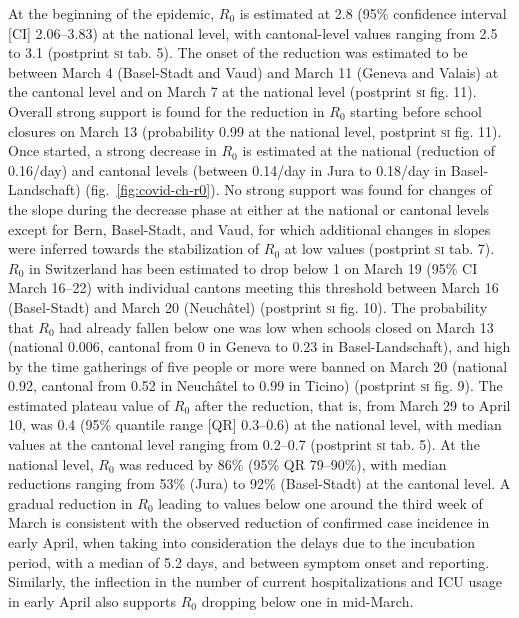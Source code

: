 At the beginning of the epidemic, $R_0$ is estimated at 2.8 (95\% confidence interval [CI] 2.06–3.83) at the national level, with cantonal-level values ranging from 2.5 to 3.1 (postprint \textsc{si} tab. 5). The onset of the reduction was estimated to be between March 4 (Basel-Stadt and Vaud) and March 11 (Geneva and Valais) at the cantonal level and on March 7 at the national level (postprint \textsc{si} fig. 11). Overall strong support is found for the reduction in $R_0$ starting before school closures on March 13 (probability 0.99 at the national level, postprint \textsc{si} fig. 11). Once started, a strong decrease in $R_0$ is estimated at the national (reduction of 0.16/day) and cantonal levels (between 0.14/day in Jura to 0.18/day in Basel-Landschaft) (fig.~\ref{fig:covid-ch-r0}). No strong support was found for changes of the slope during the decrease phase at either at the national or cantonal levels except for Bern, Basel-Stadt, and Vaud, for which additional changes in slopes were inferred towards the stabilization of $R_0$ at low values (postprint \textsc{si} tab. 7). $R_0$ in Switzerland has been estimated to drop below 1 on March 19 (95\% CI March 16–22) with individual cantons meeting this threshold between March 16 (Basel-Stadt) and March 20 (Neuchâtel) (postprint \textsc{si} fig. 10). The probability that $R_0$ had already fallen below one was low when schools closed on March 13 (national 0.006, cantonal from $0$ in Geneva to 0.23 in Basel-Landschaft), and high by the time gatherings of five people or more were banned on March 20 (national 0.92, cantonal from 0.52 in Neuchâtel to 0.99 in Ticino) (postprint \textsc{si} fig. 9). The estimated plateau value of $R_0$ after the reduction, that is, from March 29 to April 10, was 0.4 (95\% quantile range [QR] 0.3–0.6) at the national level, with median values at the cantonal level ranging from 0.2–0.7 (postprint \textsc{si} tab. 5). At the national level, $R_0$ was reduced by 86\% (95\% QR 79–90\%), with median reductions ranging from 53\% (Jura) to 92\% (Basel-Stadt) at the cantonal level. A gradual reduction in $R_0$ leading to values below one around the third week of March is consistent with the observed reduction of confirmed case incidence in early April, when taking into consideration the delays due to the incubation period, with a median of 5.2 days\cite[-6\baselineskip]{Lauer:IncubationPeriodCoronavirus:2020}, and between symptom onset and reporting\cite[-2\baselineskip]{Bi:EpidemiologyTransmissionCOVID19:2020}. Similarly, the inflection in the number of current hospitalizations and ICU usage in early April also supports $R_0$ dropping below one in mid-March. 

